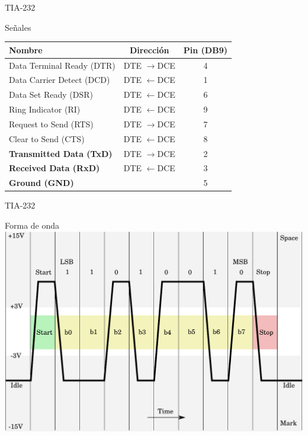 \documentclass[xcolor=dvipsnames, handout]{beamer}
\newcommand{\iic}{I\ensuremath{^2}C\ }
\newcommand{\pageframe}[1]{\frame{\begin{center}{ \Huge #1 }\end{center}}}
\newcommand{\rtl}{\ensuremath{\leftarrow}}
\newcommand{\ltr}{\ensuremath{\rightarrow}}
\begin{document}
\begin{frame}{TIA-232}
  \begin{block}{Señales}
    \begin{tabular}{|l|c|c|}\hline
      Nombre			& Dirección	& Pin (DB9) \\\hline\hline
      Data Terminal Ready (DTR) & DTE \ltr DCE	& 4 \\\hline
      Data Carrier Detect (DCD)	& DTE \rtl DCE 	& 1 \\\hline
      Data Set Ready (DSR)	& DTE \rtl DCE 	& 6 \\\hline
      Ring Indicator (RI)	& DTE \rtl DCE 	& 9 \\\hline
      Request to Send (RTS)	& DTE \ltr DCE 	& 7 \\\hline
      Clear to Send (CTS)	& DTE \rtl DCE 	& 8 \\\hline
      \textbf{Transmitted Data (TxD)}	& DTE \ltr DCE 	& 2 \\\hline
      \textbf{Received Data (RxD)}	& DTE \rtl DCE 	& 3 \\\hline
      \textbf{Ground (GND)}		& 		& 5 \\\hline	
    \end{tabular}
  \end{block}
\end{frame}


\begin{frame}{TIA-232}  
  \begin{block}{Forma de onda}
    \includegraphics[width=\textwidth]{rs232-trace}
  \end{block}
\end{frame}

\pageframe{\iic}
\end{document}
